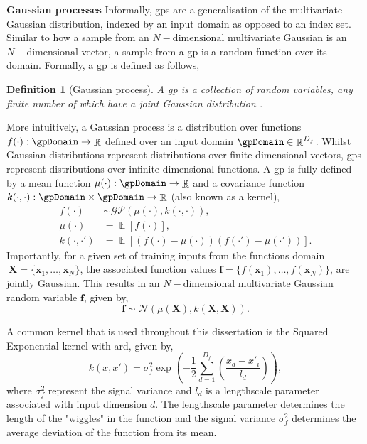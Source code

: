 \documentclass{mimosis-class/mimosis}
\newtheorem{definition}{Definition}[section]
\numberwithin{equation}{chapter}
\DeclareMathOperator{\R}{\mathbb{R}}
\DeclareMathOperator{\E}{\mathbb{E}}
\begin{document}
\textbf{Gaussian processes}
Informally, \acrshort{gps} are a generalisation of the multivariate Gaussian distribution, indexed by an
input domain as opposed to an index set.
Similar to how a sample from an \(N-\text{dimensional}\) multivariate Gaussian is an \(N-\text{dimensional}\) vector,
a sample from a \acrshort{gp} is a random function over its domain.
Formally, a \acrshort{gp} is defined as follows,
\begin{definition}[Gaussian process]
A \acrfull{gp} is a collection of random variables, any finite number of which
have a joint Gaussian distribution \citep{rasmussenGaussian2006}.
\end{definition}

More intuitively, a Gaussian process  is a distribution over functions \(f(\cdot): \gpDomain \rightarrow \R\)
defined over an input domain \(\gpDomain \in \R^{D_f}\).
Whilst Gaussian distributions represent distributions over finite-dimensional vectors, \acrshort{gps} represent
distributions over infinite-dimensional functions.
A \acrshort{gp} is fully defined by a mean function \(\mu(\cdot) : \gpDomain \rightarrow \R\) and a covariance
function \(k(\cdot, \cdot) : \gpDomain \times \gpDomain \rightarrow \R\) (also known as a kernel),
\begin{align} \label{eq-gp-mean-cov}
f(\cdot) &\sim \mathcal{GP}\left(\mu(\cdot), k(\cdot,\cdot) \right), \\
\mu(\cdot) &= \E[f(\cdot)], \\
k(\cdot, \cdot') &= \E[(f(\cdot) -\mu(\cdot)) (f(\cdot') - \mu(\cdot'))].
\end{align}
Importantly, for a given set of training inputs from the
functions domain \(~{\mathbf{X} = \{ \mathbf{x}_1, \ldots, \mathbf{x}_N \}}\), the associated function values
\(\mathbf{f} = \{f(\mathbf{x}_1), \ldots, f(\mathbf{x}_N) \}\),
are jointly Gaussian.
This results in an \(N-\text{dimensional}\) multivariate Gaussian random variable \(\mathbf{f}\), given by,
\begin{equation} \label{eq-gp-marginal}
\mathbf{f} \sim \mathcal{N}(\mu(\mathbf{X}), k(\mathbf{X}, \mathbf{X})).
\end{equation}
\begin{myquote}
A common kernel that is used throughout this dissertation is the Squared Exponential
kernel with \acrfull{ard}, given by,
\begin{equation} \label{eq-se-kernel}
k(x, x') = \sigma_f^2 \exp\left(-\frac{1}{2} \sum_{d=1}^{D_f} \left( \frac{x_{d}- x'_{i}}{l_d} \right) \right),
\end{equation}
where $\sigma_f^2$ represent the signal variance and $l_d$ is a lengthscale parameter associated with
input dimension $d$.
The lengthscale parameter determines the length of the "wiggles" in the function and
the signal variance $\sigma_f^2$ determines the average deviation of the function from its mean.
\end{myquote}
\end{document}
